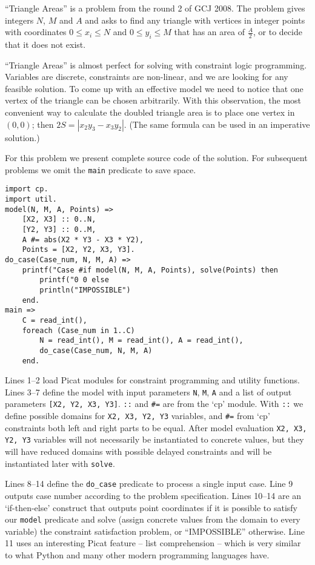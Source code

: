 \documentclass{llncs}
\begin{document}
``Triangle Areas'' is a problem from the round 2 of GCJ 2008.
The problem gives integers $N$, $M$ and $A$ and asks to find any
triangle with vertices in integer points with coordinates $0 \leq x_i \leq N$
and $0 \leq y_i \leq M$ that has an area of $\frac{A}{2}$, or to decide that it does not exist.

``Triangle Areas'' is almost perfect for solving with constraint logic programming.
Variables are discrete, constraints are non-linear, and we are looking for any feasible solution.
To come up with an effective model we need to notice that one vertex of the triangle can be chosen arbitrarily.
With this observation, the most convenient way to calculate the doubled triangle area is to place one vertex in $(0,0)$; then $2S = |x_2y_3 - x_3y_2|$.
(The same formula can be used in an imperative solution.)

For this problem we present complete source code of the solution.
For subsequent problems we omit the \texttt{main} predicate to save space.

\begin{lstlisting}[caption={Complete Picat program for the ``Triangle Areas'' problem}]
import cp.
import util.
model(N, M, A, Points) =>
    [X2, X3] :: 0..N,
    [Y2, Y3] :: 0..M,
    A #= abs(X2 * Y3 - X3 * Y2),
    Points = [X2, Y2, X3, Y3].
do_case(Case_num, N, M, A) =>
    printf("Case #if model(N, M, A, Points), solve(Points) then
        printf("0 0 else
        println("IMPOSSIBLE")
    end.
main =>
    C = read_int(),
    foreach (Case_num in 1..C)
        N = read_int(), M = read_int(), A = read_int(),
        do_case(Case_num, N, M, A)
    end.
\end{lstlisting}

Lines 1--2 load Picat modules for constraint programming and utility functions.
Lines 3--7 define the model with input parameters \texttt{N}, \texttt{M}, \texttt{A} and a list of output parameters \texttt{[X2, Y2, X3, Y3]}.
\texttt{::} and \texttt{\#=} are from the `cp' module.
With \texttt{::} we define possible domains for \texttt{X2, X3, Y2, Y3} variables,
and \texttt{\#=} from `cp' constraints both left and right parts to be equal.
After model evaluation \texttt{X2, X3, Y2, Y3} variables will not necessarily be instantiated to concrete values, but they will have reduced domains with possible delayed constraints
and will be instantiated later with \texttt{solve}.

Lines 8--14 define the \texttt{do\_case} predicate to process a single input case. Line 9 outputs case number according to the problem specification.
Lines 10--14 are an `if-then-else' construct that outputs point coordinates if it is possible to satisfy our \texttt{model} predicate and solve
(assign concrete values from the domain to every variable) the constraint satisfaction problem, or ``IMPOSSIBLE'' otherwise.
Line 11 uses an interesting Picat feature -- list comprehension -- which is very similar to what Python and many other modern programming languages have.
\end{document}
